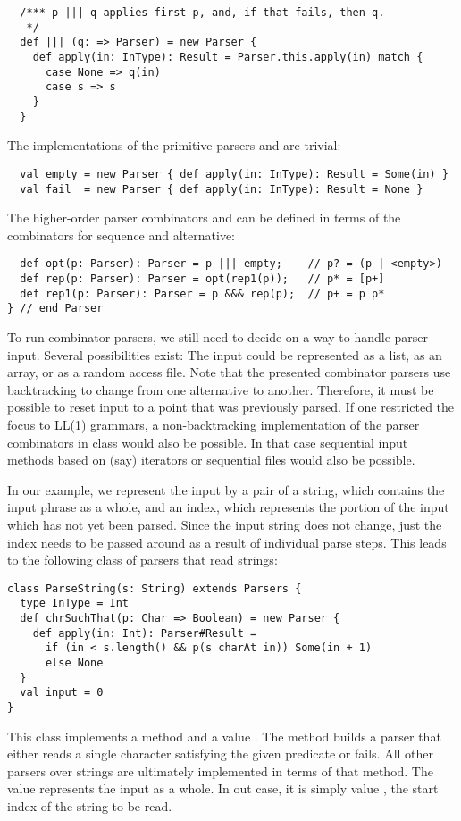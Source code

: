 {{\begin{lstlisting}
  /*** p ||| q applies first p, and, if that fails, then q.
   */
  def ||| (q: => Parser) = new Parser {
    def apply(in: InType): Result = Parser.this.apply(in) match {
      case None => q(in)
      case s => s
    }
  }
\end{lstlisting}
The implementations of the primitive parsers  and 
are trivial:
\begin{lstlisting}
  val empty = new Parser { def apply(in: InType): Result = Some(in) }
  val fail  = new Parser { def apply(in: InType): Result = None }
\end{lstlisting}
The higher-order parser combinators  and  can be
defined in terms of the combinators for sequence and alternative:
\begin{lstlisting}
  def opt(p: Parser): Parser = p ||| empty;    // p? = (p | <empty>)
  def rep(p: Parser): Parser = opt(rep1(p));   // p* = [p+]
  def rep1(p: Parser): Parser = p &&& rep(p);  // p+ = p p*
} // end Parser
\end{lstlisting}
To run combinator parsers, we still need to decide on a way to handle
parser input. Several possibilities exist: The input could be
represented as a list, as an array, or as a random access file.  Note
that the presented combinator parsers use backtracking to change from
one alternative to another.  Therefore, it must be possible to reset
input to a point that was previously parsed. If one restricted the
focus to LL(1) grammars, a non-backtracking implementation of the
parser combinators in class  would also be possible. In
that case sequential input methods based on (say) iterators or
sequential files would also be possible.

In our example, we represent the input by a pair of a string, which
contains the input phrase as a whole, and an index, which represents
the portion of the input which has not yet been parsed. Since the
input string does not change, just the index needs to be passed around
as a result of individual parse steps.  This leads to the following
class of parsers that read strings:
\begin{lstlisting}
class ParseString(s: String) extends Parsers {
  type InType = Int
  def chrSuchThat(p: Char => Boolean) = new Parser {
    def apply(in: Int): Parser#Result =
      if (in < s.length() && p(s charAt in)) Some(in + 1)
      else None
  }
  val input = 0
}
\end{lstlisting}
This class implements a method  and a
value . The  method builds a parser that either
reads a single character satisfying the given predicate  or
fails.  All other parsers over strings are ultimately implemented in
terms of that method. The  value represents the input as a
whole. In out case, it is simply value , the start index of
the string to be read.

}}
